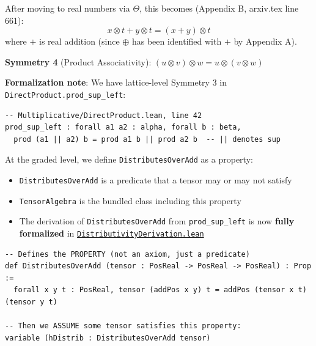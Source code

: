 \documentclass[11pt]{article}
\theoremstyle{definition}
\theoremstyle{remark}
\begin{document}
After moving to real numbers via $\Theta$, this becomes (Appendix B, arxiv.tex line 661):
\[ x \otimes t + y \otimes t = (x + y) \otimes t \]
where $+$ is real addition (since $\oplus$ has been identified with $+$ by Appendix A).

\textbf{Symmetry 4} (Product Associativity): $(u \otimes v) \otimes w = u \otimes (v \otimes w)$

\textbf{Formalization note}: We have lattice-level Symmetry 3 in \texttt{DirectProduct.prod\_sup\_left}:
\begin{lstlisting}
-- Multiplicative/DirectProduct.lean, line 42
prod_sup_left : forall a1 a2 : alpha, forall b : beta,
  prod (a1 || a2) b = prod a1 b || prod a2 b  -- || denotes sup
\end{lstlisting}

At the graded level, we define \texttt{DistributesOverAdd} as a property:
\begin{itemize}
\item \texttt{DistributesOverAdd} is a predicate that a tensor may or may not satisfy
\item \texttt{TensorAlgebra} is the bundled class including this property
\item The derivation of \texttt{DistributesOverAdd} from \texttt{prod\_sup\_left} is now
\textbf{fully formalized} in \href{https://github.com/zariuq/ks-foundations-of-inference/blob/main/KnuthSkilling/Multiplicative/DistributivityDerivation.lean}{\texttt{DistributivityDerivation.lean}}
\end{itemize}

\begin{lstlisting}[caption={Distributivity property (\href{https://github.com/zariuq/ks-foundations-of-inference/blob/main/KnuthSkilling/Multiplicative/Basic.lean\#L68}{Multiplicative/Basic.lean:68})},numbers=none]
-- Defines the PROPERTY (not an axiom, just a predicate)
def DistributesOverAdd (tensor : PosReal -> PosReal -> PosReal) : Prop :=
  forall x y t : PosReal, tensor (addPos x y) t = addPos (tensor x t) (tensor y t)

-- Then we ASSUME some tensor satisfies this property:
variable (hDistrib : DistributesOverAdd tensor)
\end{lstlisting}
\end{document}
